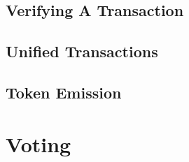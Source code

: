 \documentclass[]{article}   %
\begin{document}
\subsection{Verifying A Transaction}



\subsection{Unified Transactions}

\subsection{Token Emission}


\section{Voting}




\end{document}
